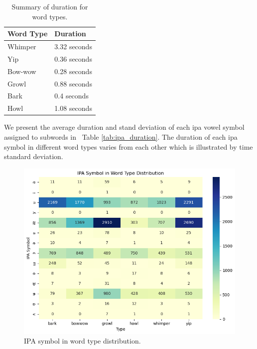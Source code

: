 \documentclass[letterpaper]{article}
\newcommand{\tabref}[1]{Table \ref{#1}}
\begin{document}
\begin{table}[th]
\small
\centering
\begin{tabular}{p{}|p{}}
\toprule
\textbf{Word Type} & \textbf{Duration} \\
\hline
Whimper & 3.32 seconds \\
\hline
Yip & 0.36 seconds \\
\hline
Bow-wow & 0.28 seconds\\
\hline
Growl & 0.88 seconds \\
\hline
Bark & 0.4 seconds \\
\hline
Howl & 1.08 seconds \\
\bottomrule
\end{tabular}
\caption{Summary of duration for word types.}
\label{tab:duration}
\end{table}

We present the average duration and stand deviation of each ipa vowel symbol assigned to subwords in ~\tabref{tab:ipa_duration}. The duration of each ipa symbol in different word types varies from each other which is illustrated by time standard deviation. 
\begin{figure}[th]
\centering
\includegraphics[width=0.8\columnwidth]{images/ipa_type_distri.png}
\caption{IPA symbol in word type distribution.} 
\label{fig:ipa_type_distri}
\end{figure}
\end{document}
